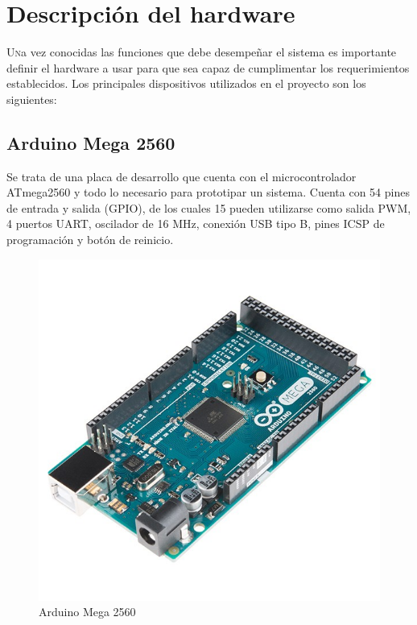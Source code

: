 \chapter{Descripción del hardware}\label{chp-02}

\lettrine[lraise=-0.1, lines=2, loversize=0.2]{U}na vez conocidas las funciones
que debe desempeñar el sistema es importante definir el hardware a usar para que
sea capaz de cumplimentar los requerimientos establecidos. Los principales dispositivos
utilizados en el proyecto son los siguientes:

\section{Arduino Mega 2560}

Se trata de una placa de desarrollo que cuenta con el microcontrolador ATmega2560 y todo lo
necesario para prototipar un sistema. Cuenta con 54 pines de entrada y salida (GPIO), de los cuales
15 pueden utilizarse como salida PWM, 4 puertos UART, oscilador de 16 MHz, conexión USB tipo B,
pines ICSP de programación y botón de reinicio.

\begin{figure}[hbtp]
	\centering
	\includegraphics[scale=0.5]{02-hardware/01-arduino-mega-2560.jpg}
	\caption{Arduino Mega 2560}
	\label{fig:figura21}
	\end{figure}


